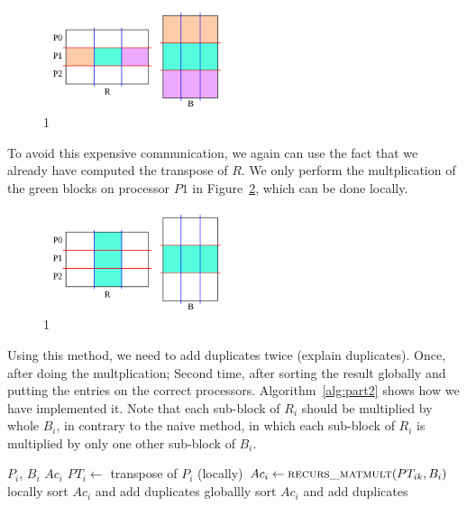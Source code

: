 \begin{figure}[tbh]
 \centering
 \includegraphics[width=5.5cm,height=3cm]{./figures/part2d.pdf}
 \caption{1}
 \label{fig:part2d}
\end{figure}

To avoid this expensive communication, we again can use the fact that we already have computed the transpose of $R$. We only perform the multplication of the green blocks on processor $P1$ in Figure~\ref{fig:part2e}, which can be done locally.

\begin{figure}[tbh]
 \centering
 \includegraphics[width=5.5cm,height=3cm]{./figures/part2e.pdf}
 \caption{1}
 \label{fig:part2e}
\end{figure}

Using this method, we need to add duplicates twice (explain duplicates). Once, after doing the multplication; Second time, after sorting the result globally and putting the entries on the correct processors. Algorithm~\ref{alg:part2} shows how we have implemented it. Note that each sub-block of $R_i$ should be multiplied by whole $B_i$, in contrary to the naive method, in which each sub-block of $R_i$ is multiplied by only one other sub-block of $B_i$.

\begin{algorithm}[H] 
  \caption{Part 2: $Ac = R \times B$} \label{alg:part2} 
  \begin{algorithmic}[1]
    \Require $P_i$, $B_i$
    \Ensure  $Ac_i$
    \State $PT_i \leftarrow$ transpose of $P_i$ (locally)
      \State $Ac_i \leftarrow \textsc{recurs\_matmult}(PT_{ik}, B_i)$
    \EndFor
    \State locally sort $Ac_i$ and add duplicates
    \State globallly sort $Ac_i$ and add duplicates
  \end{algorithmic}
\end{algorithm}
